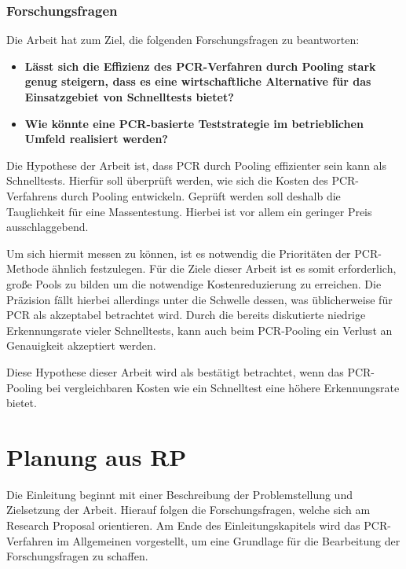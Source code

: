 \subsubsection{Forschungsfragen}
Die Arbeit hat zum Ziel, die folgenden Forschungsfragen zu beantworten:

\begin{itemize}
	\item \textbf{Lässt sich die Effizienz des PCR-Verfahren durch Pooling stark genug steigern, dass es eine wirtschaftliche Alternative für das Einsatzgebiet von Schnelltests bietet?}
	\item \textbf{Wie könnte eine PCR-basierte Teststrategie im betrieblichen Umfeld realisiert werden?}
\end{itemize}

Die Hypothese der Arbeit ist, dass PCR durch Pooling effizienter sein kann als Schnelltests.
Hierfür soll überprüft werden, wie sich die Kosten des PCR-Verfahrens durch Pooling entwickeln.
Geprüft werden soll deshalb die Tauglichkeit für eine Massentestung.
Hierbei ist vor allem ein geringer Preis ausschlaggebend.

Um sich hiermit messen zu können, ist es notwendig die Prioritäten der PCR-Methode ähnlich festzulegen.
Für die Ziele dieser Arbeit ist es somit erforderlich, große Pools zu bilden um die notwendige Kostenreduzierung zu erreichen.
Die Präzision fällt hierbei allerdings unter die Schwelle dessen, was üblicherweise für PCR als akzeptabel betrachtet wird.
Durch die bereits diskutierte niedrige Erkennungsrate vieler Schnelltests, kann auch beim PCR-Pooling ein Verlust an Genauigkeit akzeptiert werden.

Diese Hypothese dieser Arbeit wird als bestätigt betrachtet, wenn das PCR-Pooling bei vergleichbaren Kosten wie ein Schnelltest eine höhere Erkennungsrate bietet.


\section{Planung aus RP}
Die Einleitung beginnt mit einer Beschreibung der Problemstellung und Zielsetzung der Arbeit.
Hierauf folgen die Forschungsfragen, welche sich am Research Proposal orientieren.
Am Ende des Einleitungskapitels wird das PCR-Verfahren im Allgemeinen vorgestellt, um eine Grundlage für die Bearbeitung der Forschungsfragen zu schaffen.

